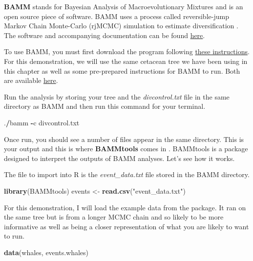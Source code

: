 \documentclass[
]{book}
\newenvironment{Shaded}{\begin{snugshade}}{\end{snugshade}}
\newcommand{\KeywordTok}[1]{\textcolor[rgb]{0.13,0.29,0.53}{\textbf{#1}}}
\newcommand{\NormalTok}[1]{#1}
\newcommand{\OperatorTok}[1]{\textcolor[rgb]{0.81,0.36,0.00}{\textbf{#1}}}
\newcommand{\StringTok}[1]{\textcolor[rgb]{0.31,0.60,0.02}{#1}}
\begin{document}
\textbf{BAMM} stands for Bayesian Analysis of Macroevolutionary Mixtures and is an open source piece of software. BAMM uses a process called reversible-jump Markov Chain Monte-Carlo (rjMCMC) simulation to estimate diversification \citep{Rabosky14}. The software and accompanying documentation can be found \href{http://bamm-project.org/}{here}.

To use BAMM, you must first download the program following \href{http://bamm-project.org/download.html}{these instructions}. For this demonstration, we will use the same cetacean tree we have been using in this chapter as well as some pre-prepared instructions for BAMM to run. Both are available \href{http://lukejharmon.github.io/ilhabela/instruction/2015/07/02/diversification-analysis-bamm-rpanda/\#rpanda}{here}.

Run the analysis by storing your tree and the \emph{divcontrol.txt} file in the same directory as BAMM and then run this command for your terminal.

\begin{Shaded}
\begin{Highlighting}[]
\NormalTok{.}\OperatorTok{/}\NormalTok{bamm }\OperatorTok{{-}}\NormalTok{c divcontrol.txt}
\end{Highlighting}
\end{Shaded}

Once run, you should see a number of files appear in the same directory. This is your output and this is where \textbf{BAMMtools} comes in \citep{bammtools}. BAMMtools is a package designed to interpret the outputs of BAMM analyses. Let's see how it works.

The file to import into R is the \emph{event\_data.txt} file stored in the BAMM directory.

\begin{Shaded}
\begin{Highlighting}[]
\KeywordTok{library}\NormalTok{(BAMMtools)}
\NormalTok{events \textless{}{-}}\StringTok{ }\KeywordTok{read.csv}\NormalTok{(}\StringTok{"event\_data.txt"}\NormalTok{)}
\end{Highlighting}
\end{Shaded}

For this demonstration, I will load the example data from the package. It ran on the same tree but is from a longer MCMC chain and so likely to be more informative as well as being a closer representation of what you are likely to want to run.

\begin{Shaded}
\begin{Highlighting}[]
\KeywordTok{data}\NormalTok{(whales, events.whales)}
\end{Highlighting}
\end{Shaded}
\end{document}
